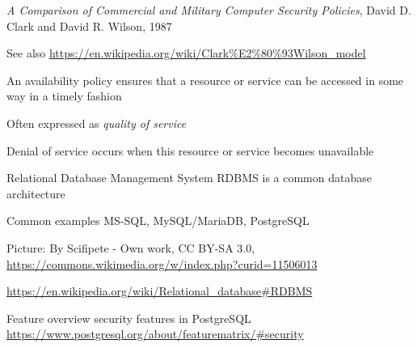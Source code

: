 \documentclass[Screen16to9,17pt]{foils}
\begin{document}
\emph{A Comparison of Commercial and Military Computer Security Policies},
David D. Clark and David R. Wilson, 1987


See also
\url{https://en.wikipedia.org/wiki/Clark%E2%80%93Wilson_model}




\begin{list1}
\item An availability policy ensures that a resource or service can be accessed in some way in a timely fashion
\item Often expressed as \emph{quality of service}
\item Denial of service occurs when this resource or service becomes unavailable
\end{list1}



\begin{list1}
\item Relational Database Management System RDBMS is a common database architecture
\item Common examples MS-SQL, MySQL/MariaDB, PostgreSQL
\item Picture: By Scifipete - Own work, CC BY-SA 3.0,\\ \url{https://commons.wikimedia.org/w/index.php?curid=11506013}
\item \url{https://en.wikipedia.org/wiki/Relational_database#RDBMS}
\end{list1}


Feature overview security features in PostgreSQL\\
\url{https://www.postgresql.org/about/featurematrix/#security}

\end{document}
